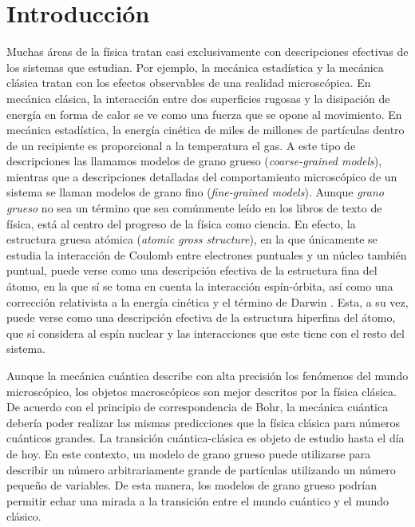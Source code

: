 \chapter{Introducción}



Muchas áreas de la física tratan casi exclusivamente con descripciones efectivas de los sistemas que estudian. Por ejemplo, la mecánica estadística y la mecánica clásica tratan con los efectos observables de una realidad microscópica. En mecánica clásica, la interacción entre dos superficies rugosas y la disipación de energía en forma de calor se ve como una fuerza que se opone al movimiento. En mecánica estadística, la energía cinética de miles de millones de partículas dentro de un recipiente es proporcional a la temperatura el gas. A este tipo de descripciones las llamamos modelos de grano grueso (\textit{coarse-grained models}), mientras que a descripciones detalladas del comportamiento microscópico de un sistema se llaman modelos de grano fino (\textit{fine-grained models}). Aunque \textit{grano grueso} no sea un término que sea comúnmente leído en los libros de texto de física, está al centro del progreso de la física como ciencia. En efecto, la estructura gruesa atómica (\textit{atomic gross structure}), en la que únicamente se estudia la interacción de Coulomb entre electrones puntuales y un núcleo también puntual, puede verse como una descripción efectiva de la estructura fina del átomo, en la que sí se toma en cuenta la interacción espín-órbita, así como una corrección relativista a la energía cinética y el término de Darwin \cite{Bransden}. Esta, a su vez, puede verse como una descripción efectiva de la estructura hiperfina del átomo, que sí considera al espín nuclear y las interacciones que este tiene con el resto del sistema.


Aunque la mecánica cuántica describe con alta precisión los fenómenos del mundo microscópico, los objetos macroscópicos son mejor descritos por la física clásica. De acuerdo con el principio de correspondencia de Bohr, la mecánica cuántica debería poder realizar las mismas predicciones que la física clásica para números cuánticos grandes. La transición cuántica-clásica es objeto de estudio hasta el día de hoy. En este contexto, un modelo de grano grueso puede utilizarse para describir un número arbitrariamente grande de partículas utilizando un número pequeño de variables. De esta manera, los modelos de grano grueso podrían permitir echar una mirada a la transición entre el mundo cuántico y el mundo clásico.

